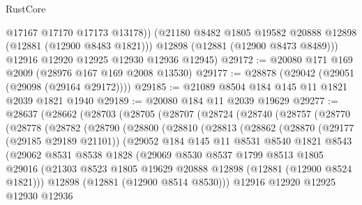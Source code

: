 \begin{lexlean}{RustCore}
\begin{coremodule}
            @17167
            @17170
            @17173
            @13178))
        (@21180 @8482 @1805 @19582 @20888 @12898 (@12881 (@12900 @8483 @1821)))
        @12898
        (@12881 (@12900 @8473 @8489)))
      @12916
      @12920
      @12925
      @12930
      @12936
      @12945)
@29172 := @20080 @171 @169 @2009 (@28976 @167 @169 @2008 @13530)
@29177 := @28878 (@29042 (@29051 (@29098 (@29164 @29172))))
@29185 := @21089 @8504 @184 @145 @11 @1821 @2039 @1821 @1940
@29189 := @20080 @184 @11 @2039 @19629
@29277 := @28637
    (@28662
      (@28703
        (@28705
          (@28707
            (@28724
              (@28740
                (@28757
                  (@28770
                    (@28778
                      (@28782
                        (@28790
                          (@28800
                            (@28810
                              (@28813
                                (@28862
                                  (@28870
                                    (@29177 (@29185 @29189 @21101))
                                    (@29052
                                      @184
                                      @145
                                      @11
                                      @8531
                                      @8540
                                      @1821
                                      @8543
                                      (@29062
                                        @8531
                                        @8538
                                        @1828
                                        (@29069
                                          @8530
                                          @8537
                                          @1799
                                          @8513
                                          @1805
                                          @29016
                                          (@21303
                                            @8523
                                            @1805
                                            @19629
                                            @20888
                                            @12898
                                            (@12881 (@12900 @8524 @1821)))
                                          @12898
                                          (@12881 (@12900 @8514 @8530)))
                                        @12916
                                        @12920
                                        @12925
                                        @12930
                                        @12936

\end{coremodule}
\end{lexlean}
